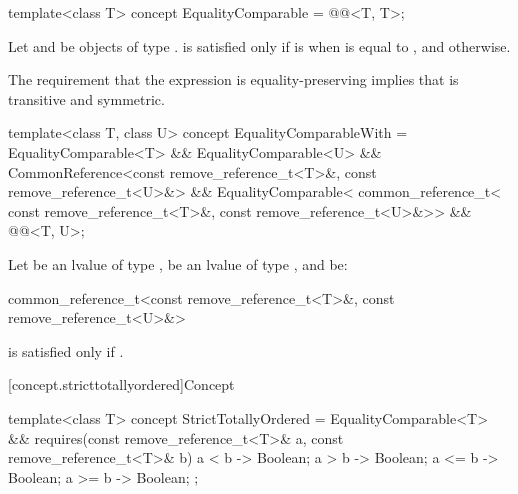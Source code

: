 %
\begin{itemdecl}
template<class T>
  concept EqualityComparable = @@<T, T>;
\end{itemdecl}

\begin{itemdescr}
\pnum
Let  and  be objects of type .
 is satisfied only if
 is  when  is equal to
, and  otherwise.

\pnum
\begin{note}
The requirement that the expression  is equality-preserving
implies that \tcode{==} is transitive and symmetric.
\end{note}
\end{itemdescr}

%
\begin{itemdecl}
template<class T, class U>
  concept EqualityComparableWith =
    EqualityComparable<T> && EqualityComparable<U> &&
    CommonReference<const remove_reference_t<T>&, const remove_reference_t<U>&> &&
    EqualityComparable<
      common_reference_t<
        const remove_reference_t<T>&,
        const remove_reference_t<U>&>> &&
    @@<T, U>;
\end{itemdecl}

\begin{itemdescr}
\pnum
Let  be an lvalue of type ,
 be an lvalue of type ,
and  be:
\begin{codeblock}
common_reference_t<const remove_reference_t<T>&, const remove_reference_t<U>&>
\end{codeblock}
 is satisfied only if
.
\end{itemdescr}

[concept.stricttotallyordered]{Concept }

%
\begin{itemdecl}
template<class T>
  concept StrictTotallyOrdered =
    EqualityComparable<T> &&
    requires(const remove_reference_t<T>& a,
             const remove_reference_t<T>& b) {
      { a <  b } -> Boolean;
      { a >  b } -> Boolean;
      { a <= b } -> Boolean;
      { a >= b } -> Boolean;
    };
\end{itemdecl}

